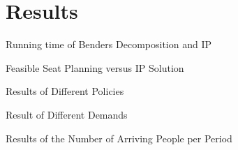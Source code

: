 
\section{Results}
    \frame{\sectionpage}

    \begin{frame}{Running time of Benders Decomposition and IP}
        
      
    \end{frame}
      
    \begin{frame}{Feasible Seat Planning versus IP Solution}
    
    \end{frame}
      
    \begin{frame}{Results of Different Policies}
    
    
    \end{frame}
      
    \begin{frame}{Result of Different Demands}
    
    \end{frame}
      
      
    \begin{frame}{Results of the Number of Arriving People per Period}
    
    \end{frame}
      


